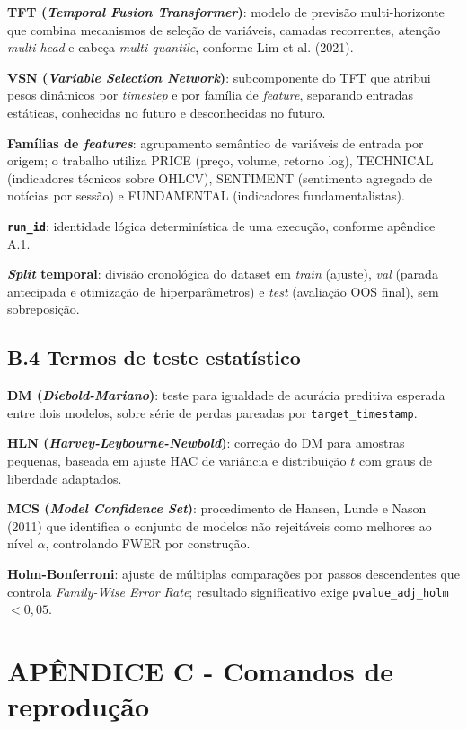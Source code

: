 \textbf{TFT (\textit{Temporal Fusion Transformer})}: modelo de previsão multi-horizonte que combina mecanismos de seleção de variáveis, camadas recorrentes, atenção \textit{multi-head} e cabeça \textit{multi-quantile}, conforme Lim et al. (2021).

\textbf{VSN (\textit{Variable Selection Network})}: subcomponente do TFT que atribui pesos dinâmicos por \textit{timestep} e por família de \textit{feature}, separando entradas estáticas, conhecidas no futuro e desconhecidas no futuro.

\textbf{Famílias de \textit{features}}: agrupamento semântico de variáveis de entrada por origem; o trabalho utiliza PRICE (preço, volume, retorno log), TECHNICAL (indicadores técnicos sobre OHLCV), SENTIMENT (sentimento agregado de notícias por sessão) e FUNDAMENTAL (indicadores fundamentalistas).

\textbf{\texttt{run\_id}}: identidade lógica determinística de uma execução, conforme apêndice A.1.

\textbf{\textit{Split} temporal}: divisão cronológica do dataset em \textit{train} (ajuste), \textit{val} (parada antecipada e otimização de hiperparâmetros) e \textit{test} (avaliação OOS final), sem sobreposição.

\section*{B.4 Termos de teste estatístico}

\textbf{DM (\textit{Diebold-Mariano})}: teste para igualdade de acurácia preditiva esperada entre dois modelos, sobre série de perdas pareadas por \texttt{target\_timestamp}.

\textbf{HLN (\textit{Harvey-Leybourne-Newbold})}: correção do DM para amostras pequenas, baseada em ajuste HAC de variância e distribuição \(t\) com graus de liberdade adaptados.

\textbf{MCS (\textit{Model Confidence Set})}: procedimento de Hansen, Lunde e Nason (2011) que identifica o conjunto de modelos não rejeitáveis como melhores ao nível \(\alpha\), controlando FWER por construção.

\textbf{Holm-Bonferroni}: ajuste de múltiplas comparações por passos descendentes que controla \textit{Family-Wise Error Rate}; resultado significativo exige \texttt{pvalue\_adj\_holm} \(< 0{,}05\).

\chapter*{APÊNDICE C - Comandos de reprodução}

